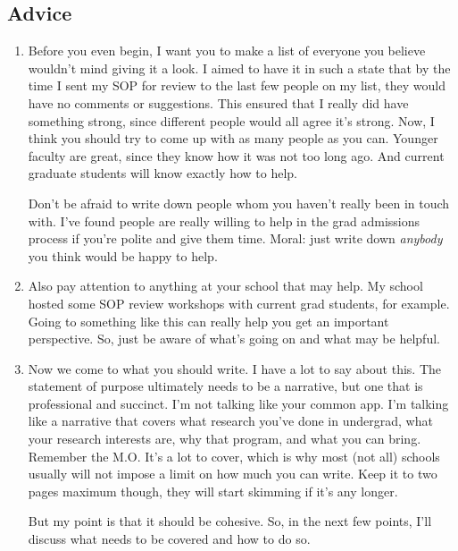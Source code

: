\documentclass[12pt]{article}
\begin{document}
\subsection{Advice}
\begin{enumerate}
	\item Before you even begin, I want you to make a list of everyone you believe wouldn't mind giving it a look. I aimed to have it in such a state that by the time I sent my SOP for review to the last few people on my list, they would have no comments or suggestions. This ensured that I really did have something strong, since different people would all agree it's strong. Now, I think you should try to come up with as many people as you can. Younger faculty are great, since they know how it was not too long ago. And current graduate students will know exactly how to help. 

	Don't be afraid to write down people whom you haven't really been in touch with. I've found people are really willing to help in the grad admissions process if you're polite and give them time. Moral: just write down \textit{anybody} you think would be happy to help.

	\item Also pay attention to anything at your school that may help. My school hosted some SOP review workshops with current grad students, for example. Going to something like this can really help you get an important perspective. So, just be aware of what's going on and what may be helpful.

	\item Now we come to what you should write. I have a lot to say about this. The statement of purpose ultimately needs to be a narrative, but one that is professional and succinct. I'm not talking like your common app. I'm talking like a narrative that covers what research you've done in undergrad,  what your research interests are, why that program, and what you can bring. Remember the M.O. It's a lot to cover, which is why most (not all) schools usually will not impose a limit on how much you can write. Keep it to two pages maximum though, they will start skimming if it's any longer.

	But my point is that it should be cohesive. So, in the next few points, I'll discuss what needs to be covered and how to do so.


\end{enumerate}
\end{document}
